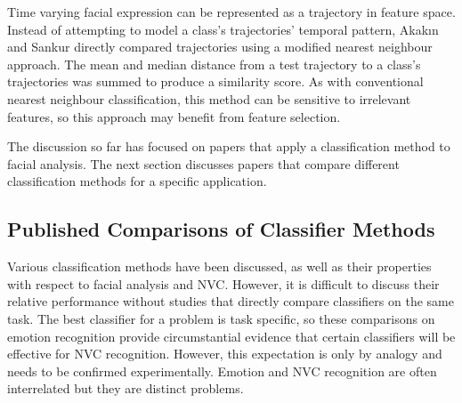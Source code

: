 
Time varying facial expression can be represented as a trajectory in feature space. Instead of attempting to model a class's trajectories' temporal pattern, Akak{\i}n and Sankur \cite{Akakin2011} directly compared trajectories using a modified nearest neighbour approach. The mean and median distance from a test trajectory to a class's trajectories was summed to produce a similarity score. As with conventional nearest neighbour classification, this method can be sensitive to irrelevant features, so this approach may benefit from feature selection.

The discussion so far has focused on papers that apply a classification method to facial analysis. The next section discusses papers that compare different classification methods for a specific application.

\subsection{Published Comparisons of Classifier Methods}

Various classification methods have been discussed, as well as their properties with respect to facial analysis and \ac{NVC}. However, it is difficult to discuss their relative performance without studies that directly compare classifiers on the same task. The best classifier for a problem is task specific, so these comparisons on emotion recognition provide circumstantial evidence that certain classifiers will be effective for \ac{NVC} recognition. However, this expectation is only by analogy and needs to be confirmed experimentally. Emotion and \ac{NVC} recognition are often interrelated but they are distinct problems.%
 
